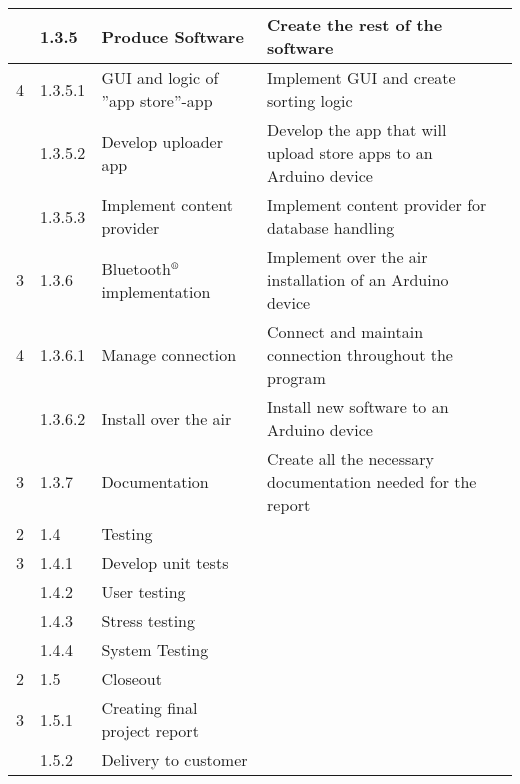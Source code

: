 \begin{longtable}{|m{}|m{}|m{}|m{}|m{}|}
\hline
	 & 1.3.5 & Produce Software & Create the rest of the software & \\
\hline
	4 & 1.3.5.1 & GUI and logic of ''app store''-app & Implement GUI and create sorting logic & \\
\hline
	 & 1.3.5.2 & Develop uploader app & Develop the app that will upload store apps to an Arduino device & \\
\hline
	 & 1.3.5.3 & Implement content provider & Implement content provider for database handling & \\
\hline
	3 & 1.3.6 & Bluetooth$\textsuperscript{\textregistered}$ implementation & Implement over the air installation of an Arduino device & \\
\hline
	4 & 1.3.6.1 & Manage connection & Connect and maintain connection throughout the program & \\
\hline
	 & 1.3.6.2 & Install over the air & Install new software to an Arduino device & \\
\hline
	3 & 1.3.7 & Documentation & Create all the necessary documentation needed for the report & \\
\hline
	2 & 1.4 & Testing & & \\
\hline
	3 & 1.4.1 & Develop unit tests & & \\
\hline
	 & 1.4.2 & User testing & & \\
\hline
	 & 1.4.3 & Stress testing & & \\
\hline
	 & 1.4.4 & System Testing & & \\
\hline
	2 & 1.5 & Closeout & & \\
\hline
	3 & 1.5.1 & Creating final project report & & \\
\hline
	 & 1.5.2 & Delivery to customer & & \\
\hline
\end{longtable}
